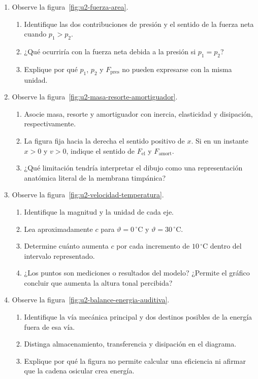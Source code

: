 \begin{enumerate}[label=\textbf{R\arabic*.},leftmargin=*]
    \item Observe la figura~\ref{fig:u2-fuerza-area}.
    \begin{enumerate}[label=\alph*)]
        \item Identifique las dos contribuciones de presión y el sentido de la
        fuerza neta cuando \(p_1>p_2\).
        \item ¿Qué ocurriría con la fuerza neta debida a la presión si
        \(p_1=p_2\)?
        \item Explique por qué \(p_1\), \(p_2\) y \(F_\mathrm{pres}\) no pueden
        expresarse con la misma unidad.
    \end{enumerate}

    \item Observe la figura~\ref{fig:u2-masa-resorte-amortiguador}.
    \begin{enumerate}[label=\alph*)]
        \item Asocie masa, resorte y amortiguador con inercia, elasticidad y
        disipación, respectivamente.
        \item La figura fija hacia la derecha el sentido positivo de \(x\). Si
        en un instante \(x>0\) y \(v>0\), indique el sentido de
        \(F_\mathrm{el}\) y \(F_\mathrm{amort}\).
        \item ¿Qué limitación tendría interpretar el dibujo como una
        representación anatómica literal de la membrana timpánica?
    \end{enumerate}

    \item Observe la figura~\ref{fig:u2-velocidad-temperatura}.
    \begin{enumerate}[label=\alph*)]
        \item Identifique la magnitud y la unidad de cada eje.
        \item Lea aproximadamente \(c\) para
        \(\vartheta=0\,^{\circ}\text{C}\) y
        \(\vartheta=30\,^{\circ}\text{C}\).
        \item Determine cuánto aumenta \(c\) por cada incremento de
        \(10\,^{\circ}\text{C}\) dentro del intervalo representado.
        \item ¿Los puntos son mediciones o resultados del modelo? ¿Permite el
        gráfico concluir que aumenta la altura tonal percibida?
    \end{enumerate}

    \item Observe la figura~\ref{fig:u2-balance-energia-auditiva}.
    \begin{enumerate}[label=\alph*)]
        \item Identifique la vía mecánica principal y dos destinos posibles de
        la energía fuera de esa vía.
        \item Distinga almacenamiento, transferencia y disipación en el
        diagrama.
        \item Explique por qué la figura no permite calcular una eficiencia ni
        afirmar que la cadena osicular crea energía.
    \end{enumerate}
\end{enumerate}

